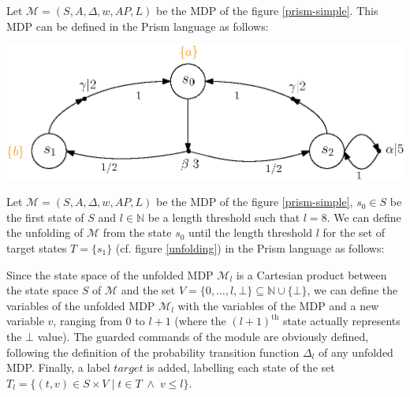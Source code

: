 \begin{example}
Let $\mathcal{M}=(S, A, \Delta, w, AP, L)$ be the MDP of the figure \ref{prism-simple}. This MDP can be defined in the Prism language as follows:\\
\begin{minipage}{0.4\linewidth}
  
\end{minipage}
\begin{minipage}{0.6\linewidth}
    \includegraphics[width=\linewidth]{resources/simple-mdp}
    \captionsetup{justification=centering}
    \label{prism-simple}
\end{minipage}
\end{example}

\begin{example}
Let $\mathcal{M}=(S, A, \Delta, w, AP, L)$ be the MDP of the figure \ref{prism-simple}, $s_0 \in S$ be the first state of $S$ and $l \in \mathbb{N}$
be a length threshold such that $l=8$. We can define the unfolding of $\mathcal{M}$ from the state $s_0$ until the length threshold $l$ for the set of target states $T = \{s_1\}$ (cf. figure \ref{unfolding}) in the Prism language as follows:

\end{example}
Since the state space of the unfolded MDP $\mathcal{M}_l$ is a Cartesian product between the state space $S$ of $\mathcal{M}$ and the set $V = \{0, \dots, l, \bot\} \subseteq \mathbb{N} \cup \{\bot\}$, we can define the variables of the unfolded MDP $\mathcal{M}_l$ with the variables of the MDP and a new variable $v$, ranging from $0$ to $l+1$ (where the $(l+1)^\text{th}$ state actually represents the $\bot$ value). The guarded
commands of the module are obviously defined, following the definition of the
probability transition function $\Delta_l$ of any unfolded MDP. Finally, a label $target$ is added,
labelling each state of the set $T_l = \{ (t, v) \in S \times V \; | \; t \in T \; \wedge \; v \leq l \}$.

